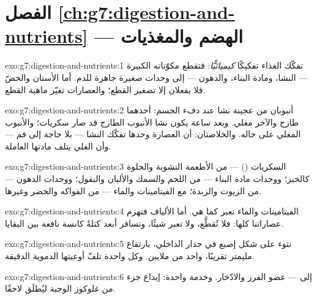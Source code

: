 \section*{الفصل \ref{ch:g7:digestion-and-nutrients} --- الهضم والمغذيات}

\begin{solution}{exo:g7:digestion-and-nutrients:1}
تفكّك الغذاء تفكيكًا \emph{كيميائيًّا}: فتقطع مكوّناته الكبيرة ---
النشا، ومادة البناء، والدهون --- إلى وحدات صغيرة جاهزة للدم. أما
الأسنان والخضّ فلا يفعلان إلا تصغير القطع؛ والعصارات تغيّر ماهية
القطع.
\end{solution}

\begin{solution}{exo:g7:digestion-and-nutrients:2}
أنبوبان من عجينة نشا عند دفء الجسم: أحدهما  طازج والآخر 
مغلي. وبعد ساعة يكون نشا الأنبوب الطازج قد صار سكريات؛ والأنبوب
المغلي على حاله. والخلاصتان: أن العصارة وحدها تفكّك النشا --- بلا
حاجة إلى فم --- وأن الغلي يتلف مادتها العاملة.
\end{solution}

\begin{solution}{exo:g7:digestion-and-nutrients:3}
السكريات () --- من الأطعمة النشوية والحلوة كالخبز؛ ووحدات
مادة البناء --- من اللحم والسمك  والألبان والبقول؛ ووحدات
الدهون --- من الزيوت والزبدة؛ مع الفيتامينات 
والماء --- من الفواكه والخضر وغيرها.
\end{solution}

\begin{solution}{exo:g7:digestion-and-nutrients:4}
الفيتامينات  والماء تعبر كما هي. أما الألياف
فتهزم عصاراتنا كلها: فلا تُقطَّع، ولا تعبر شيئًا، وتسافر أبعد كتلةً
كانسة نافعة بين البقايا.
\end{solution}

\begin{solution}{exo:g7:digestion-and-nutrients:5}
نتوء على شكل إصبع في جدار  الداخلي، بارتفاع مليمتر
تقريبًا، واحد من ملايين. وكل واحدة تلفّ أوعيتها الدموية الدقيقة.
\end{solution}

\begin{solution}{exo:g7:digestion-and-nutrients:6}
إلى  --- عضو الفرز والادّخار. وخدمة واحدة: إيداع جزء من
غلوكوز الوجبة ليُطلَق لاحقًا.
\end{solution}

